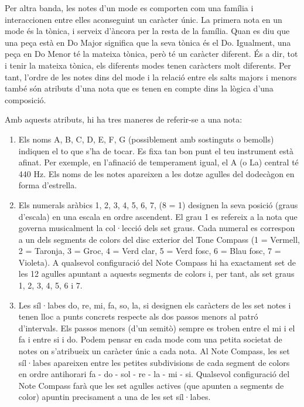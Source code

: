 Per  altra banda, les notes d'un mode es comporten com una família i interaccionen entre elles aconseguint un caràcter únic. La primera nota en un mode és la tònica, i serveix d'àncora per la resta de la família. Quan es diu que una peça està en Do Major significa que la seva tònica és el Do. Igualment, una peça en Do Menor té la mateixa tònica, però té un caràcter diferent. És a dir, tot i tenir la mateixa tònica, els diferents modes tenen caràcters molt diferents. Per tant, l'ordre de les notes dins del mode i la relació entre els salts majors i menors també són atributs d'una nota que es tenen en compte dins la lògica d'una composició. 


Amb aquests atributs, hi ha tres maneres de referir-se a una nota:

\begin{enumerate}

\item Els noms A, B, C, D, E, F, G (possiblement amb sostinguts o bemolls) indiquen el to que s'ha de tocar. Es fixa tan bon punt el teu instrument està afinat. Per exemple, en l'afinació de temperament igual, el A (o La) central té 440 Hz. Els noms de les notes apareixen a les dotze agulles del dodecàgon en forma d'estrella.

\item Els numerals aràbics 1, 2, 3, 4, 5, 6, 7, (8 = 1) designen la seva posició (graus d'escala) en una escala en ordre ascendent. El grau 1 es refereix a la nota que governa musicalment la col·lecció dels set graus.  Cada numeral es correspon a un dels segments de colors del disc exterior del Tone Compass (1 = Vermell, 2 = Taronja, 3 = Groc, 4 = Verd clar, 5 = Verd fosc, 6 = Blau fosc, 7 = Violeta). A qualsevol configuració del Note Compass hi ha exactament set de les 12 agulles apuntant a aquests segments de colors i, per tant, als set graus 1, 2, 3, 4, 5, 6 i 7. 

\item Les síl·labes do, re, mi, fa, so, la, si designen els caràcters de les set notes i tenen lloc a punts concrets respecte als dos passos menors al patró d'intervals. Els passos menors (d'un semitò) sempre es troben entre el mi i el fa i entre si i do. Podem pensar en cada mode com una petita societat de notes on s'atribueix un caràcter únic a cada nota. Al Note Compass, les set síl·labes apareixen entre les petites subdivisions de cada segment de colors en ordre antihorari fa - do - sol - re - la - mi - si. Qualsevol configuració del Note Compass farà que les set agulles actives (que apunten a segments de color) apuntin precisament a una de les set síl·labes. 

\end{enumerate}

